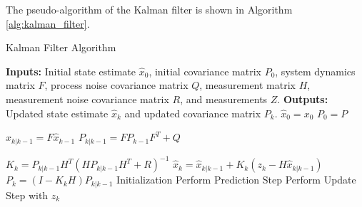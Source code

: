 The pseudo-algorithm of the Kalman filter is shown in Algorithm \ref{alg:kalman_filter}.
\begin{algorithm}
    \caption{Kalman Filter Algorithm}
    \begin{algorithmic}[1]
        \State \textbf{Inputs:} Initial state estimate $\hat{x}_0$, initial covariance matrix $P_0$, system
        dynamics matrix $F$, process noise covariance matrix $Q$, measurement matrix $H$, measurement noise
        covariance matrix $R$, and measurements $Z$.
        \State \textbf{Outputs:} Updated state estimate $\hat{x}_k$ and updated covariance matrix $P_k$.
        \State
            \State $\hat{x}_0 = x_0$  
            \State $P_0 = P$ 
        \EndProcedure

        \State
            \State $\hat{x}_{k|k-1} = F \hat{x}_{k-1} $ 
            \State $P_{k|k-1} = F P_{k-1} F^T + Q$ 
        \EndProcedure

        \State
            \State $K_k = P_{k|k-1} H^T (H P_{k|k-1} H^T + R)^{-1}$ 
            \State $\hat{x}_k = \hat{x}_{k|k-1} + K_k(z_k - H \hat{x}_{k|k-1})$ 
            \State $P_k = (I - K_k H) P_{k|k-1}$ 
        \EndProcedure
        \State
            \State Initialization
                \State Perform Prediction Step
                \State Perform Update Step with $z_k$
            \EndFor
        \EndProcedure

    \end{algorithmic}
    \label{alg:kalman_filter}
\end{algorithm}